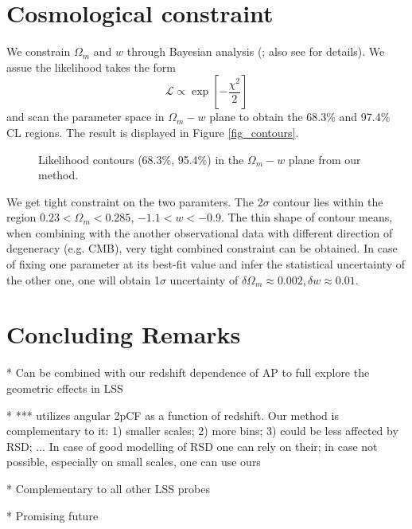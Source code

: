 \documentclass[iop]{emulateapj}
\begin{document}
\section{Cosmological constraint}



We constrain $\Omega_m$ and $w$ through Bayesian analysis (\citep{Bayesian}; also see \citep{LB2002,Li2016} for details).
We assue the likelihood takes the form
\begin{equation}
 \mathcal{L} \propto \exp\left[-\frac{\chi^2}{2}\right]
\end{equation}
and scan the parameter space in $\Omega_m-w$ plane to obtain the 68.3\% and 97.4\% CL regions.
The result is displayed in Figure \ref{fig_contours}.


\begin{figure}
   \centering{
   }
   \caption{\label{fig9.eps}
   Likelihood contours (68.3\%, 95.4\%) in the $\Omega_m-w$ plane from our method.
   }
\end{figure}

We get tight constraint on the two paramters.
The 2$\sigma$ contour lies within the region $0.23<\Omega_m<0.285$, $-1.1<w<-0.9$.
The thin shape of contour means, when combining with the another observational data with different direction of degeneracy (e.g. CMB),
very tight combined constraint can be obtained.
In case of fixing one parameter at its best-fit value and infer the statistical uncertainty of the other one,
one will obtain 1$\sigma$ uncertainty of $\delta\Omega_m\approx0.002,\delta w\approx0.01$. 


\section{Concluding Remarks}
 
 * Can be combined with our redshift dependence of AP to full explore the geometric effects in LSS
 
 *  *** utilizes angular 2pCF as a function of redshift. Our method is complementary to it: 1) smaller scales; 2) more bins; 3) could be less affected by RSD; ... In case of good modelling of RSD one can rely on their; in case not possible, especially on small scales, one can use ours
 
 * Complementary to all other LSS probes
 
 * Promising future
 
\end{document}
